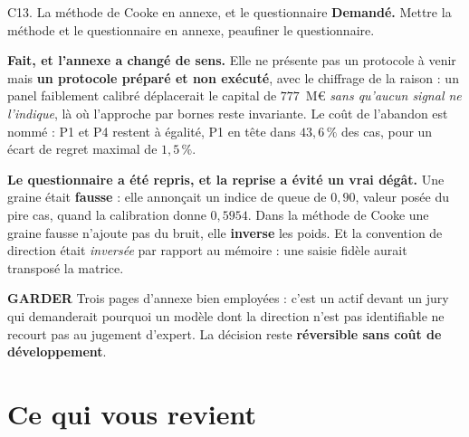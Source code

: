 \documentclass[11pt]{beamer}
\newcommand{\garder}{\textbf{GARDER}}
\newcommand{\srcs}[1]{\vspace{0.8mm}{\tiny\textcolor{gray!50!black}{Sources : #1}}}
\begin{document}
\begin{frame}{C13. La méthode de Cooke en annexe, et le questionnaire}
\scriptsize
\textbf{Demandé.} Mettre la méthode et le questionnaire en annexe, peaufiner le questionnaire.
\vspace{1mm}

\textbf{Fait, et l'annexe a changé de sens.} Elle ne présente pas un protocole à venir mais
\textbf{un protocole préparé et non exécuté}, avec le chiffrage de la raison : un panel
faiblement calibré déplacerait le capital de $777$~M\euro{} \emph{sans qu'aucun signal ne
l'indique}, là où l'approche par bornes reste invariante. Le coût de l'abandon est nommé : P1 et
P4 restent à égalité, P1 en tête dans $43{,}6\,\%$ des cas, pour un écart de regret maximal de
$1{,}5\,\%$.
\vspace{1mm}

\textbf{Le questionnaire a été repris, et la reprise a évité un vrai dégât.} Une graine était
\textbf{fausse} : elle annonçait un indice de queue de $0{,}90$, valeur posée du pire cas, quand
la calibration donne $0{,}5954$. Dans la méthode de Cooke une graine fausse n'ajoute pas du
bruit, elle \textbf{inverse} les poids. Et la convention de direction était \emph{inversée} par
rapport au mémoire : une saisie fidèle aurait transposé la matrice.
\begin{block}{\garder}
Trois pages d'annexe bien employées : c'est un actif devant un jury qui demanderait pourquoi un
modèle dont la direction n'est pas identifiable ne recourt pas au jugement d'expert. La décision
reste \textbf{réversible sans coût de développement}.
\end{block}
\srcs{scripts~\texttt{26}, \texttt{30}, \texttt{31} et~\texttt{47}}
\end{frame}

\section*{Ce qui vous revient}

\end{document}

